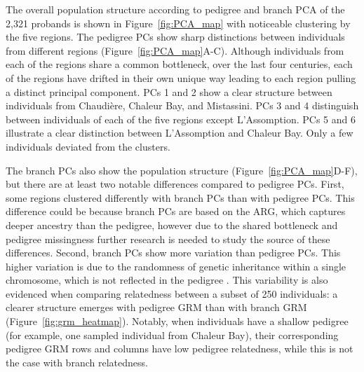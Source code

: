 The overall population structure according to pedigree and branch PCA
of the 2,321 probands is shown in Figure~\ref{fig:PCA_map}
with noticeable clustering by the five regions.
%
The pedigree PCs show sharp distinctions between individuals from different regions
(Figure~\ref{fig:PCA_map}A-C).
%
Although individuals from each of the regions share a common bottleneck,
over the last four centuries,
each of the regions have drifted in their own unique way
leading to each region pulling a distinct principal component.
%
PCs 1 and 2 show a clear structure between individuals from Chaudière, Chaleur Bay, and Mistassini.
%
PCs 3 and 4 distinguish between individuals of each of the five regions except L'Assomption.
%
PCs 5 and 6 illustrate a clear distinction between L'Assomption and Chaleur Bay.
%
Only a few individuals deviated from the clusters.

The branch PCs also show the population structure (Figure~\ref{fig:PCA_map}D-F),
but there are at least two notable differences compared to pedigree PCs.
%
First, some regions clustered differently with branch PCs than with pedigree PCs.
%
This difference could be because branch PCs are based on the ARG,
which captures deeper ancestry than the pedigree,
however due to the shared bottleneck and pedigree missingness
further research is needed to study the source of these differences.
%
Second, branch PCs show more variation than pedigree PCs.
%
This higher variation is due to the randomness of genetic inheritance within a single chromosome, which is not reflected in the pedigree \citep{weir2006genetic, hill2011variation, thompson2013identity, garciacortes2013variance}.
%
This variability is also evidenced when comparing relatedness between a subset of 250 individuals: a clearer structure emerges with pedigree GRM than with branch GRM (Figure~\ref{fig:grm_heatmap}).
% 
%
%
%
%
Notably, when individuals have a shallow pedigree
(for example, one sampled individual from Chaleur Bay),
their corresponding pedigree GRM rows and columns have low pedigree relatedness,
while this is not the case with branch relatedness.

